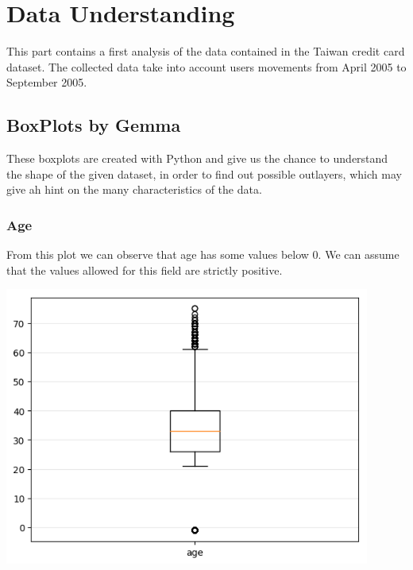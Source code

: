 \documentclass[a4paper]{article}
\begin{document}

\tableofcontents
\newpage




\section{Data Understanding}

This part contains a first analysis of the data contained in the Taiwan credit card dataset. The collected data take into account users movements from April 2005 to September 2005.

\subsection{BoxPlots by Gemma}
These boxplots are created with Python and give us the chance to understand the shape of the given dataset, in order to find out possible outlayers, which may give ah hint on the many characteristics of the data.
\subsubsection{Age}
From this plot we can observe that age has some values below $0$. We can assume that the values allowed for this field are strictly positive.
\begin{center}
\includegraphics[width=0.9\textwidth]{../Code/boxPlotsGemma/boxplots/age.png}
\end{center}
\end{document}
